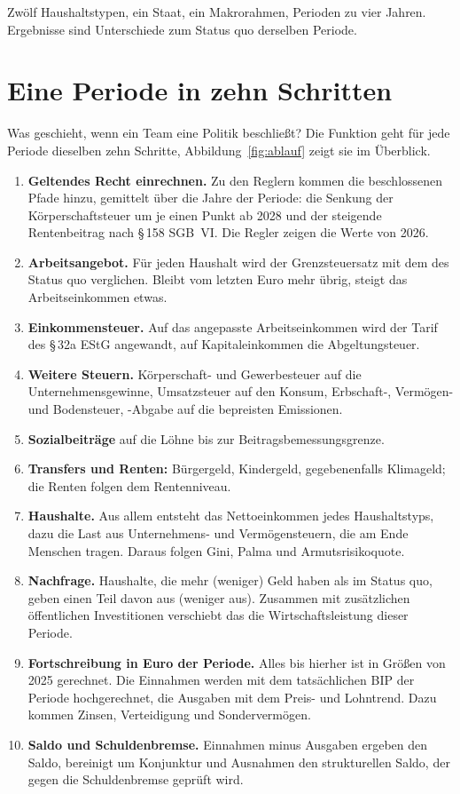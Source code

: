 \begin{merksatz}
Zwölf Haushaltstypen, ein Staat, ein Makrorahmen, Perioden zu vier Jahren. Ergebnisse sind
Unterschiede zum Status quo derselben Periode.
\end{merksatz}

\section{Eine Periode in zehn Schritten}
\label{sec:zehn}

Was geschieht, wenn ein Team eine Politik beschließt? Die Funktion  geht
für jede Periode dieselben zehn Schritte, Abbildung~\ref{fig:ablauf} zeigt sie im Überblick.

\begin{enumerate}[label=\arabic*.,leftmargin=2em]
\item \textbf{Geltendes Recht einrechnen.} Zu den Reglern kommen die beschlossenen Pfade
  hinzu, gemittelt über die Jahre der Periode: die Senkung der Körperschaftsteuer um je einen
  Punkt ab 2028 und der steigende Rentenbeitrag nach §\,158 SGB~VI. Die Regler zeigen die Werte
  von 2026.
\item \textbf{Arbeitsangebot.} Für jeden Haushalt wird der Grenzsteuersatz mit dem des Status
  quo verglichen. Bleibt vom letzten Euro mehr übrig, steigt das Arbeitseinkommen etwas.
\item \textbf{Einkommensteuer.} Auf das angepasste Arbeitseinkommen wird der Tarif des
  §\,32a EStG angewandt, auf Kapitaleinkommen die Abgeltungsteuer.
\item \textbf{Weitere Steuern.} Körperschaft- und Gewerbesteuer auf die Unternehmensgewinne,
  Umsatzsteuer auf den Konsum, Erbschaft-, Vermögen- und Bodensteuer, \COz-Abgabe auf die
  bepreisten Emissionen.
\item \textbf{Sozialbeiträge} auf die Löhne bis zur Beitragsbemessungsgrenze.
\item \textbf{Transfers und Renten:} Bürgergeld, Kindergeld, gegebenenfalls Klimageld; die
  Renten folgen dem Rentenniveau.
\item \textbf{Haushalte.} Aus allem entsteht das Nettoeinkommen jedes Haushaltstyps, dazu
  die Last aus Unternehmens- und Vermögensteuern, die am Ende Menschen tragen. Daraus folgen
  Gini, Palma und Armutsrisikoquote.
\item \textbf{Nachfrage.} Haushalte, die mehr (weniger) Geld haben als im Status quo, geben
  einen Teil davon aus (weniger aus). Zusammen mit zusätzlichen öffentlichen Investitionen
  verschiebt das die Wirtschaftsleistung dieser Periode.
\item \textbf{Fortschreibung in Euro der Periode.} Alles bis hierher ist in Größen von 2025
  gerechnet. Die Einnahmen werden mit dem tatsächlichen BIP der Periode hochgerechnet, die
  Ausgaben mit dem Preis- und Lohntrend. Dazu kommen Zinsen, Verteidigung und
  Sondervermögen.
\item \textbf{Saldo und Schuldenbremse.} Einnahmen minus Ausgaben ergeben den Saldo, bereinigt
  um Konjunktur und Ausnahmen den strukturellen Saldo, der gegen die Schuldenbremse geprüft
  wird.
\end{enumerate}

